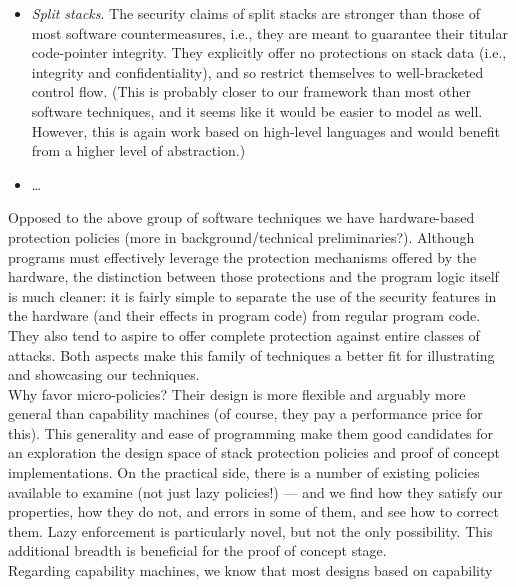 {\begin{itemize}
  in creating gadget chains'' (Shanbhogue et al.). This technique is solely
  concerned with control-flow integrity, and so closely related to our
  well-bracketed control flow. Nevertheless, and again, it is only an
  approximate technique, and our testing framework would be able to find the
  expected attacks against our security property.
%
\item \emph{Split stacks}. The security claims of split stacks are stronger than
  those of most software countermeasures, i.e., they are meant to guarantee
  their titular code-pointer integrity. They explicitly offer no protections on
  stack data (i.e., integrity and confidentiality), and so restrict themselves
  to well-bracketed control flow. (This is probably closer to our framework than
  most other software techniques, and it seems like it would be easier to model
  as well. However, this is again work based on high-level languages and would
  benefit from a higher level of abstraction.)
%
\item \ldots
%
\end{itemize}
%
Opposed to the above group of software techniques we have hardware-based
protection policies (more in background/technical preliminaries?). Although
programs must effectively leverage the protection mechanisms offered by the
hardware, the distinction between those protections and the program logic itself
is much cleaner: it is fairly simple to separate the use of the security
features in the hardware (and their effects in program code) from regular
program code. They also tend to aspire to offer complete protection against
entire classes of attacks. Both aspects make this family of techniques a better
fit for illustrating and showcasing our techniques.
%
\\
%
Why favor micro-policies? Their design is more flexible and arguably more
general than capability machines (of course, they pay a performance price for
this). This generality and ease of programming make them good candidates for an
exploration the design space of stack protection policies and proof of concept
implementations. On the practical side, there is a number of existing policies
available to examine (not just lazy policies!) --- and we find how they satisfy
our properties, how they do not, and errors in some of them, and see how to
correct them. Lazy enforcement is particularly novel, but not the only
possibility. This additional breadth is beneficial for the proof of concept
stage.
%
\\
%
Regarding capability machines, we know that most designs based on capability
}
